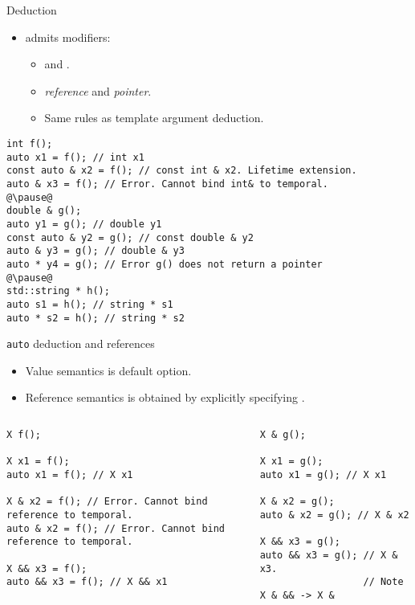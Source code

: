 \begin{frame}[t,fragile]{Deduction}
  \begin{itemize}
    \item {} admits modifiers:
      \begin{itemize}
        \item {} and .
        \item \emph{reference} and \emph{pointer}.
        \item Same rules as template argument deduction.
      \end{itemize}
  \end{itemize}
\begin{lstlisting}[escapechar=@]
int f();
auto x1 = f(); // int x1
const auto & x2 = f(); // const int & x2. Lifetime extension.
auto & x3 = f(); // Error. Cannot bind int& to temporal.
@\pause@
double & g();
auto y1 = g(); // double y1
const auto & y2 = g(); // const double & y2
auto & y3 = g(); // double & y3
auto * y4 = g(); // Error g() does not return a pointer
@\pause@
std::string * h();
auto s1 = h(); // string * s1
auto * s2 = h(); // string * s2
\end{lstlisting}
\end{frame}

\begin{frame}[fragile]{\texttt{auto} deduction and references}
  \begin{itemize}
    \item Value semantics is default option.
    \item Reference semantics is obtained by explicitly specifying .
  \end{itemize}

\begin{columns}[T]
\begin{lstlisting}
X f();

X x1 = f(); 
auto x1 = f(); // X x1

X & x2 = f(); // Error. Cannot bind reference to temporal.
auto & x2 = f(); // Error. Cannot bind reference to temporal.

X && x3 = f();
auto && x3 = f(); // X && x1
\end{lstlisting}

\pause
{}
\begin{lstlisting}
X & g();

X x1 = g();
auto x1 = g(); // X x1

X & x2 = g();
auto & x2 = g(); // X & x2

X && x3 = g();
auto && x3 = g(); // X & x3. 
                  // Note X & && -> X &
\end{lstlisting}
\end{columns}
\end{frame}

